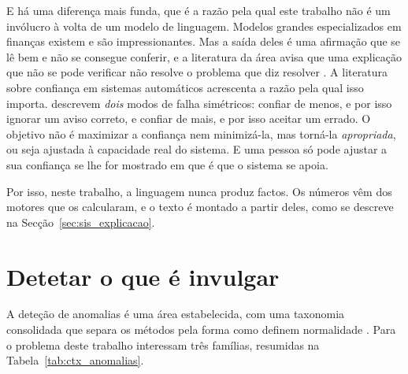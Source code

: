 E há uma diferença mais funda, que é a razão pela qual este trabalho não é um invólucro à volta de um
modelo de linguagem. Modelos grandes especializados em finanças existem
\autocite{wu2023bloomberggpt} e são impressionantes. Mas a saída deles é uma afirmação que se lê bem
e não se consegue conferir, e a literatura da área avisa que uma explicação que não se pode verificar
não resolve o problema que diz resolver \autocite{lipton2018mythos, rudin2019stop}. A literatura
sobre confiança em sistemas automáticos acrescenta a razão pela qual isso importa.
\textcite{lee2004trust} descrevem \emph{dois} modos de falha simétricos: confiar de menos, e por isso
ignorar um aviso correto, e confiar de mais, e por isso aceitar um errado. O objetivo não é maximizar
a confiança nem minimizá-la, mas torná-la \emph{apropriada}, ou seja ajustada à capacidade real do
sistema. E uma pessoa só pode ajustar a sua confiança se lhe for mostrado em que é que o sistema se
apoia.

Por isso, neste trabalho, a linguagem nunca produz factos. Os números vêm dos motores que os
calcularam, e o texto é montado a partir deles, como se descreve na
Secção~\ref{sec:sis_explicacao}.

\section{Detetar o que é invulgar}
\label{sec:ctx_anomalias}

A deteção de anomalias é uma área estabelecida, com uma taxonomia consolidada que separa os métodos
pela forma como definem normalidade \autocite{chandola2009anomaly, pang2021deep}. Para o problema
deste trabalho interessam três famílias, resumidas na Tabela~\ref{tab:ctx_anomalias}.

